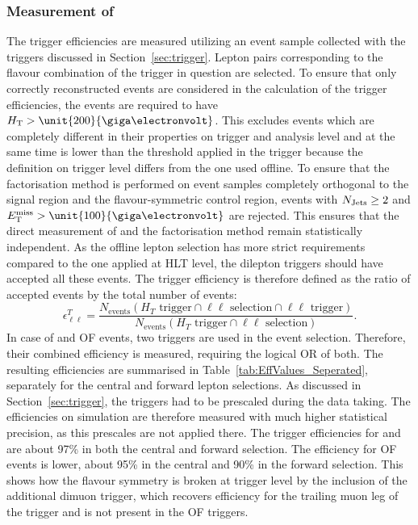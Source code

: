 \subsubsection{Measurement of \RT}
\label{sec:triggerEffs}
The trigger efficiencies are measured utilizing an event sample collected with the \HT triggers discussed in Section~\ref{sec:trigger}. Lepton pairs corresponding to the flavour combination of the trigger in question are selected. To ensure that only correctly reconstructed events are considered in the calculation of the trigger efficiencies, the events are required to have $\HT > \unit{200}{\giga\electronvolt}$. This excludes events which are completely different in their properties on trigger and analysis level and at the same time is lower than the threshold applied in the trigger because the \HT definition on trigger level differs from the one used offline. To ensure that the factorisation method is performed on event samples completely orthogonal to the signal region and the flavour-symmetric control region, events with $N_\text{Jets} \geq 2$ and $\MET > \unit{100}{\giga\electronvolt}$ are rejected. This ensures that the direct measurement of \Rsfof and the factorisation method remain statistically independent. As the offline lepton selection has more strict requirements compared to the one applied at HLT level, the dilepton triggers should have accepted all these events. The trigger efficiency is therefore defined as the ratio of accepted events by the total number of events:
\begin{equation*}
\epsilon_{\ell\ell}^T = \frac{N_{\text{events}}(H_T\text{ trigger} \cap \ell\ell\text{ selection} \cap \ell\ell\text{ trigger})}{N_{\text{events}}(H_T\text{ trigger} \cap \ell\ell\text{ selection})}.
\end{equation*}
In case of \MM and OF events, two triggers are used in the event selection. Therefore, their combined efficiency is measured, requiring the logical OR of both. The resulting efficiencies are summarised in Table~\ref{tab:EffValues_Seperated}, separately for the central and forward lepton selections. As discussed in Section~\ref{sec:trigger}, the \HT triggers had to be prescaled during the data taking. The efficiencies on simulation are therefore measured with much higher statistical precision, as this prescales are not applied there. The trigger efficiencies for \EE and \MM are about 97\% in both the central and forward selection. The efficiency for OF events is lower, about 95\% in the central and 90\% in the forward selection. This shows how the flavour symmetry is broken at trigger level by the inclusion of the additional dimuon trigger, which recovers efficiency for the trailing muon leg of the trigger and is not present in the OF triggers.   
